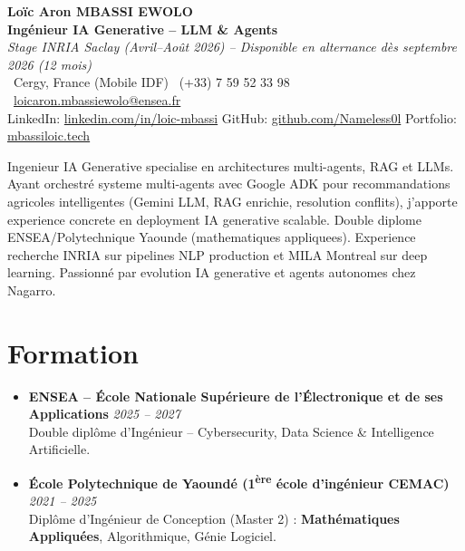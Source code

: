 \documentclass[a4paper,11pt]{article}
\begin{document}
\begin{center}
    {\Large \textbf{Lo\"ic Aron MBASSI EWOLO}} \\ \vspace{4pt}
    \textbf{\large Ing\'enieur IA Generative -- LLM \& Agents} \\
    \textit{\small Stage INRIA Saclay (Avril--Ao\^ut 2026) -- Disponible en alternance d\`es septembre 2026 (12 mois)} \\ \vspace{4pt}
    \small
    \Pointinghand\ Cergy, France (Mobile IDF) \quad
    \Mobilefone\ (+33) 7 59 52 33 98 \quad
    {\color{primary}\Letter\ \href{mailto:loicaron.mbassiewolo@ensea.fr}{loicaron.mbassiewolo@ensea.fr}} \\ \vspace{2pt}
    {\color{primary}LinkedIn: \href{https://www.linkedin.com/in/loic-mbassi/}{linkedin.com/in/loic-mbassi}} \quad
    {\color{primary}GitHub: \href{https://github.com/Nameless0l}{github.com/Nameless0l}} \quad
    {\color{primary}Portfolio: \href{https://mbassiloic.tech}{mbassiloic.tech}}
\end{center}
\vspace{-6pt}
\noindent\small{Ingenieur IA Generative specialise en architectures multi-agents, RAG et LLMs. Ayant orchestré systeme multi-agents avec Google ADK pour recommandations agricoles intelligentes (Gemini LLM, RAG enrichie, resolution conflits), j'apporte experience concrete en deployment IA generative scalable. Double diplome ENSEA/Polytechnique Yaounde (mathematiques appliquees). Experience recherche INRIA sur pipelines NLP production et MILA Montreal sur deep learning. Passionné par evolution IA generative et agents autonomes chez Nagarro.}

\section{Formation}
\begin{itemize}[leftmargin=*, label=\tiny$\bullet$, nosep]
    \item \textbf{ENSEA -- \'Ecole Nationale Sup\'erieure de l'\'Electronique et de ses Applications} \hfill \textit{2025 -- 2027} \\
    \small{Double dipl\^ome d'Ing\'enieur -- Cybersecurity, Data Science \& Intelligence Artificielle.}
    \item \textbf{\'Ecole Polytechnique de Yaound\'e (1\textsuperscript{\`ere} \'ecole d'ing\'enieur CEMAC)} \hfill \textit{2021 -- 2025} \\
    \small{Dipl\^ome d'Ing\'enieur de Conception (Master 2) : \textbf{Math\'ematiques Appliqu\'ees}, Algorithmique, G\'enie Logiciel.}
\end{itemize}
\end{document}
